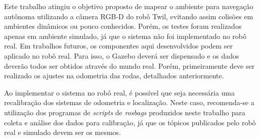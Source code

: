 \documentclass[repeatfields,xlists,xpacks,oneside,yearsonly]{ufrgscca}
\begin{document}
Este trabalho atingiu o objetivo proposto de mapear o ambiente para
navegação autônoma utilizando a câmera RGB-D do robô Twil, evitando
assim colisões em ambientes dinâmicos ou pouco conhecidos. Porém, os
testes foram realizados apenas em ambiente simulado, já que o sistema
não foi implementado no robô real. Em trabalhos futuros, os
componentes aqui desenvolvidos podem ser aplicado no robô real. Para
isso, o Gazebo deverá ser dispensado e os dados deverão todos ser
obtidos através do mundo real. Porém, primeiramente deve ser
realizado os ajustes na odometria das rodas, detalhados
anteriormente.

Ao implementar o sistema no robô real, é possível que seja necessária
uma recalibração dos sistemas de odometria e localização. Neste caso,
recomenda-se a utilização dos programas de \textit{scripts} de
\textit{rosbags} produzidos neste trabalho para coleta e análise dos
dados para calibração, já que os tópicos publicados pelo robô real e
simulado devem ser os mesmos.

\printbibliography

%
%
%
\end{document}
